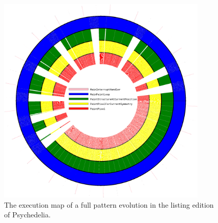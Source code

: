 \begin{figure}[H]                                                          
  \centering                                                             
  \begin{adjustbox}{width=8cm,center}                                   
  \includegraphics[width=10cm]{src/listing_commentary/execution_cycle_listing.png}%
  \end{adjustbox}                                                        
\caption{The execution map of a full pattern evolution in the listing edition of Psychedelia.}                                           
\end{figure}                                                               
\clearpage
